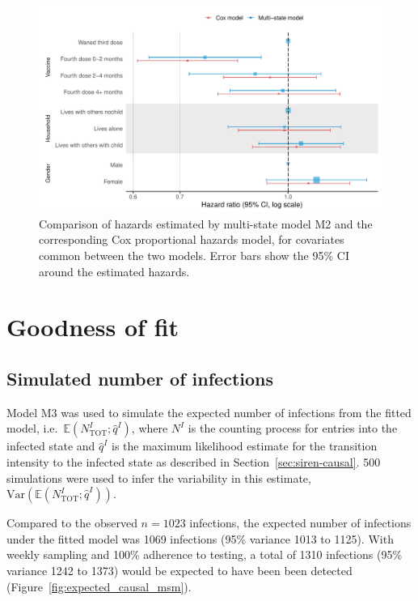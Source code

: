 \begin{figure}[htbp!]
    \centering
    \includegraphics[width=\textwidth]{vaccine_long.pdf}
    \caption[Comparison of hazards estimated by multi-state model and the corresponding Cox proportional hazards model]{Comparison of hazards estimated by multi-state model M2 and the corresponding Cox proportional hazards model, for covariates common between the two models. Error bars show the 95\% CI around the estimated hazards.}\label{fig:vaccine_long}
\end{figure}

\section{Goodness of fit}\label{appendix:siren-gof}

\subsection{Simulated number of infections}
Model M3 was used to simulate the expected number of infections from the fitted model, i.e.\ $\mathbb{E}(N^{I}_{\text{TOT}}; \hat{q}^{I})$, where $N^{I}$ is the counting process for entries into the infected state and $\hat{q}^{I}$ is the maximum likelihood estimate for the transition intensity to the infected state as described in Section~\ref{sec:siren-causal}. 500 simulations were used to infer the variability in this estimate, $\text{Var}(\mathbb{E}(N^{I}_{\text{TOT}}; \hat{q}^{I}))$.

Compared to the observed $n = 1023$ infections, the expected number of infections under the fitted model was 1069 infections (95\% variance 1013 to 1125). With weekly sampling and 100\% adherence to testing, a total of 1310 infections (95\% variance 1242 to 1373) would be expected to have been been detected (Figure~\ref{fig:expected_causal_msm}).

